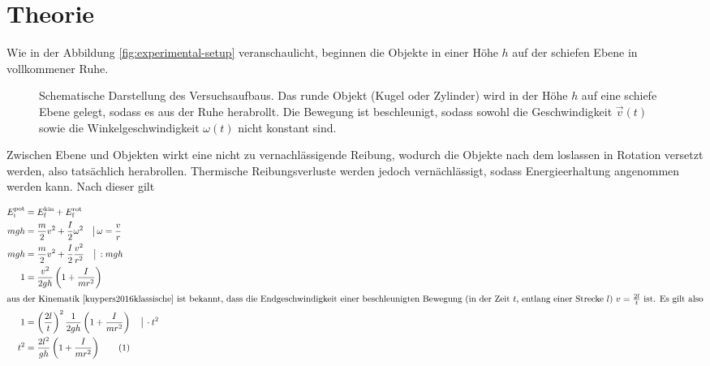 \section{Theorie}
\label{sec:Theorie}



Wie in der Abbildung \autoref{fig:experimental-setup} veranschaulicht, beginnen die Objekte 
in einer Höhe $h$ auf der schiefen Ebene in vollkommener Ruhe.


\begin{figure}
  \centering
  \caption{Schematische Darstellung des Versuchsaufbaus. Das runde Objekt (Kugel oder Zylinder) wird in der Höhe $h$
  auf eine schiefe Ebene gelegt, sodass es aus der Ruhe herabrollt. Die Bewegung ist beschleunigt, sodass sowohl
  die Geschwindigkeit $\vec{v}(t)$ sowie die Winkelgeschwindigkeit $\omega(t)$ nicht konstant sind.}
  \label{fig:experimental-setup}
\end{figure}



Zwischen Ebene und Objekten wirkt eine nicht zu vernachlässigende Reibung, wodurch die 
Objekte nach dem loslassen in Rotation versetzt werden, also tatsächlich herabrollen.
Thermische Reibungsverluste werden jedoch vernächlässigt, sodass Energieerhaltung
angenommen werden kann. Nach dieser gilt

\begin{align*}
E^\text{pot}_\text{i}  &= E^\text{kin}_\text{f} +  E^\text{rot}_\text{f} \\
mgh &= \frac{m}{2}v^2 + \frac{I}{2}\omega^2 \quad\big|\,\omega = \frac{v}{r} \\
mgh &= \frac{m}{2}v^2 + \frac{I}{2}\frac{v^2}{r^2}\quad\big|\, :mgh \\
1 &= \frac{v^2}{2gh} \left(1 + \frac{I}{mr^2} \right)\\
  \intertext{aus der Kinematik~\cite{kuypers2016klassische} ist bekannt, dass die Endgeschwindigkeit einer
beschleunigten Bewegung (in der Zeit $t$, entlang einer Strecke $l$) $v = \frac{2l}{t}$ ist.
Es gilt also}
1 &= \left(\frac{2l}{t}\right)^2 \frac{1}{2gh} \left(1 + \frac{I}{mr^2} \right)\quad\big|\, \cdot t^2 \\
\addtocounter{equation}{1}
t^2 &= \frac{2l^2}{gh} \left(1 + \frac{I}{mr^2} \right)\label{eq:tsquared}\tag{\theequation}
\end{align*}

